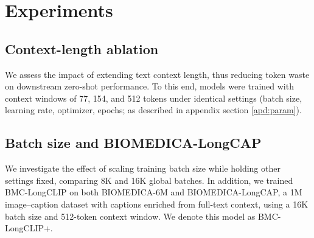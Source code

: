 
\section{Experiments}
\label{sec:experiments}


\subsection{Context-length ablation}
We assess the impact of extending text context length, thus reducing token waste on downstream zero-shot performance. To this end, models were trained with context windows of 77, 154, and 512 tokens under identical settings (batch size, learning rate, optimizer, epochs; as described in appendix section \ref{apd:param}).

\subsection{Batch size and BIOMEDICA-LongCAP}
We investigate the effect of scaling training batch size while holding other settings fixed, comparing 8K and 16K global batches. In addition, we trained BMC-LongCLIP on both BIOMEDICA-6M and BIOMEDICA-LongCAP, a 1M image–caption dataset with captions enriched from full-text context, using a 16K batch size and 512-token context window. We denote this model as BMC-LongCLIP+.






